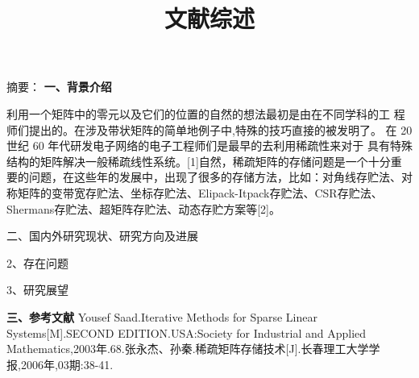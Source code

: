 \documentclass{article}
\begin{document}
  

\title{文献综述}
\date{}

\maketitle

摘要：
\newline
\textbf{一、背景介绍}
      \qquad

利用一个矩阵中的零元以及它们的位置的自然的想法最初是由在不同学科的工 程师们提出的。在涉及带状矩阵的简单地例子中,特殊的技巧直接的被发明了。 在 20 世纪 60 年代研发电子网络的电子工程师们是最早的去利用稀疏性来对于 具有特殊结构的矩阵解决一般稀疏线性系统。[1]自然，稀疏矩阵的存储问题是一个十分重要的问题，在这些年的发展中，出现了很多的存储方法，比如：对角线存贮法、对称矩阵的变带宽存贮法、坐标存贮法、Elipack-Itpack存贮法、CSR存贮法、Shermans存贮法、超矩阵存贮法、动态存贮方案等[2]。




\newline
二、国内外研究现状、研究方向及进展\newline

2、存在问题\newline

3、研究展望\newline

\newline
\textbf{三、参考文献}
      \qquad
\newline
 [1]Yousef Saad.Iterative Methods for Sparse Linear Systems[M].SECOND EDITION.USA:Society for Industrial and Applied Mathematics,2003年.68.\newline
  [2]张永杰、孙秦.稀疏矩阵存储技术[J].长春理工大学学报,2006年,03期:38-41.\newline
\end{document}
